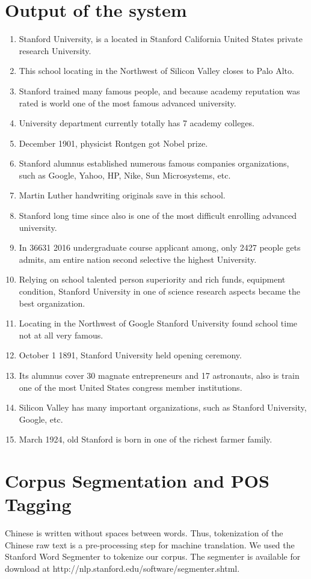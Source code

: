 \documentclass[11pt]{article} %
\begin{document}
\begin{CJK}{UTF8}{gbsn}
\section{Output of the system}
\begin{enumerate}
\item Stanford University, is a located in Stanford California United States private research University.
\item This school locating in the Northwest of Silicon Valley closes to Palo Alto.
\item Stanford trained many famous people, and because academy reputation was rated is world one of the most famous advanced university.
\item University department currently totally has 7 academy colleges.
\item December 1901, physicist Rontgen got Nobel prize.
\item Stanford alumnus established numerous famous companies organizations, such as Google, Yahoo, HP, Nike, Sun Microsystems, etc.
\item Martin Luther handwriting originals save in this school.
\item Stanford long time since also is one of the most difficult enrolling advanced university.
\item In 36631 2016 undergraduate course applicant among, only 2427 people gets admits, am entire nation second selective the highest University.
\item Relying on school talented person superiority and rich funds, equipment condition, Stanford University in one of science research aspects became the best organization.
\item Locating in the Northwest of Google Stanford University found school time not at all very famous.
\item October 1 1891, Stanford University held opening ceremony.
\item Its alumnus cover 30 magnate entrepreneurs and 17 astronauts, also is train one of the most United States congress member institutions.
\item Silicon Valley has many important organizations, such as Stanford University, Google, etc.
\item March 1924, old Stanford is born in one of the richest farmer family.
\end{enumerate}

\section{Corpus Segmentation and POS Tagging}
Chinese is written without spaces between words. Thus, tokenization of the Chinese raw text is a pre-processing step for machine translation. We used the Stanford Word Segmenter to tokenize our corpus. The segmenter is available for download at http://nlp.stanford.edu/software/segmenter.shtml.


\end{CJK}
\end{document}
